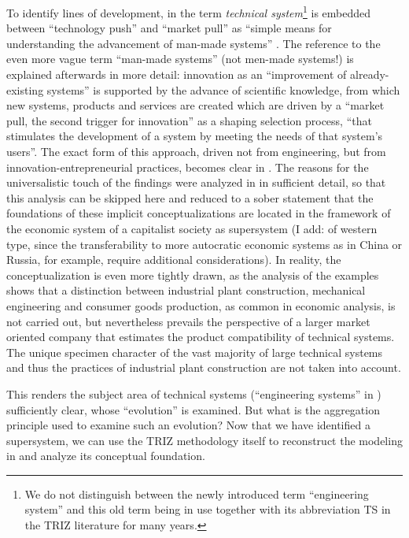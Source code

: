\documentclass{llncs}
\begin{document}
To identify lines of development, in \cite{TESE2018} the term \emph{technical
  system}\footnote{We do not distinguish between the newly introduced term
  ``engineering system'' and this old term being in use together with its
  abbreviation TS in the TRIZ literature for many years.} is embedded between
``technology push'' and ``market pull'' as ``simple means for understanding
the advancement of man-made systems'' \cite[p. 1]{TESE2018}. The reference to
the even more vague term ``man-made systems'' (not men-made systems!) is
explained afterwards in more detail: innovation as an ``improvement of
already-existing systems'' is supported by the advance of scientific
knowledge, from which new systems, products and services are created which are
driven by a ``market pull, the second trigger for innovation'' as a shaping
selection process, ``that stimulates the development of a system by meeting
the needs of that system's users''. The exact form of this approach, driven
not from engineering, but from innovation-entrepreneurial practices, becomes
clear in \cite[Chapter 3]{TESE2018}. The reasons for the universalistic touch
of the findings were analyzed in \cite{Gerovitch1996} in sufficient detail, so
that this analysis can be skipped here and reduced to a sober statement that
the foundations of these implicit conceptualizations are located in the
framework of the economic system of a capitalist society as supersystem (I
add: of western type, since the transferability to more autocratic economic
systems as in China or Russia, for example, require additional
considerations).  In reality, the conceptualization is even more tightly
drawn, as the analysis of the examples shows that a distinction between
industrial plant construction, mechanical engineering and consumer goods
production, as common in economic analysis, is not carried out, but
nevertheless prevails the perspective of a larger market oriented company that
estimates the product compatibility of technical systems.  The unique specimen
character of the vast majority of large technical systems and thus the
practices of industrial plant construction are not taken into account.

This renders the subject area of technical systems (``engineering systems'' in
\cite{TESE2018}) sufficiently clear, whose ``evolution'' is examined.  But
what is the aggregation principle used to examine such an evolution? Now that
we have identified a supersystem, we can use the TRIZ methodology itself to
reconstruct the modeling in \cite{TESE2018} and analyze its conceptual
foundation.
\end{document}
